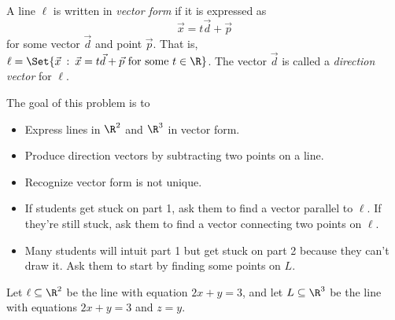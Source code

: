 \documentclass{problemset}
\providecommand\given{}
\newcommand\SetSymbol[1][]{%
	\nonscript\::%
	\allowbreak
	\nonscript\:
	\mathopen{}}
\renewcommand\given{\SetSymbol[\delimsize]}
\begin{document}
	\newpage
	\begin{definition}
		A line $\ell$ is written in \emph{vector form} if it is expressed
		as
		\[
			\vec x=t\vec d+\vec p
		\]
		for some vector $\vec d$ and point $\vec p$. That is, $\ell = \Set{\vec x\given \vec x=
		t\vec d+\vec p\text{ for some } t\in\R }$. The vector 
		$\vec d$ is called a \emph{direction
		vector} for $\ell$.
	\end{definition}

	\question
	\begin{annotation}
		\begin{goals}
			
			The goal of this problem is to
			\begin{itemize}
				\item Express lines in $\R^2$ and $\R^3$ in
					vector form.
				\item Produce direction vectors by subtracting two points
					on a line.
				\item Recognize vector form is not unique.
			\end{itemize}
		\end{goals}

		\begin{notes}
			\begin{itemize}
				\item If students get stuck on part 1, ask them
					to find a vector parallel to $\ell$. If
					they're still stuck, ask them to find a vector
					connecting two points on $\ell$.
				\item Many students will intuit part 1 but get stuck on
					part 2 because they can't draw it. Ask them
					to start by finding some points on $L$.
			\end{itemize}
		\end{notes}
	\end{annotation}
	Let $\ell\subseteq \R^2$ be the line with equation $2x+y=3$,
	and let $L\subseteq \R^3$ be the line with equations $2x+y=3$ and
	$z=y$.
\end{document}
